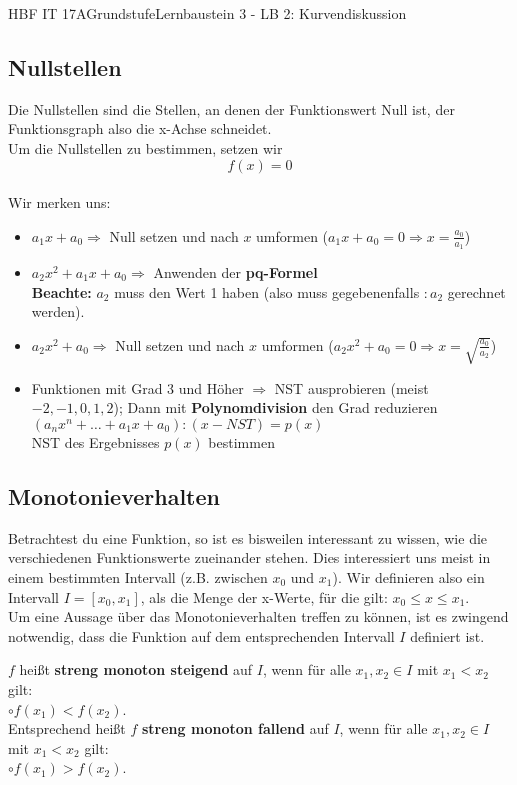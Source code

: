 \documentclass[11pt,twocolumn,oneside,openany,headings=optiontotoc,11pt,numbers=noenddot]{article}
\begin{document}
\begin{worksheet}{HBF IT 17A}{Grundstufe}{Lernbaustein 3 - LB 2: Kurvendiskussion}
		\subsection*{Nullstellen} Die Nullstellen sind die Stellen, an denen der Funktionswert Null ist, der Funktionsgraph also die x-Achse schneidet.\\
		Um die Nullstellen zu bestimmen, setzen wir \[f(x) = 0\]\\
		Wir merken uns:
		\begin{itemize}
			\item \(a_1x + a_0 \Rightarrow\) Null setzen und nach \(x\) umformen (\(a_1x + a_0 = 0 \Rightarrow x = \frac{a_0}{a_1}\))
			\item  \(a_2x^2 + a_1x + a_0 \Rightarrow\) Anwenden der \textbf{pq-Formel}\\
			\textbf{Beachte:} \(a_2\) muss den Wert 1 haben (also muss gegebenenfalls \(:a_2\) gerechnet werden).
			\item \(a_2x^2 + a_0 \Rightarrow\) Null setzen und nach \(x\) umformen (\(a_2x^2 + a_0 = 0 \Rightarrow x = \sqrt{\frac{a_0}{a_2}}\))
			\item Funktionen mit Grad 3 und Höher \(\Rightarrow\) NST ausprobieren (meist \(-2,-1,0,1,2\)); Dann mit \textbf{Polynomdivision} den Grad reduzieren\\
			\((a_nx^n + \ldots +a_1x +a_0):(x-NST) = p(x)\)\\
			NST des Ergebnisses \(p(x)\) bestimmen
		\end{itemize}
		\subsection*{Monotonieverhalten} Betrachtest du eine Funktion, so ist es bisweilen interessant zu wissen, wie die verschiedenen Funktionswerte zueinander stehen. Dies interessiert uns meist in einem bestimmten Intervall (z.B. zwischen \(x_0\) und \(x_1\)). Wir definieren also ein Intervall \(I = [x_0,x_1]\), als die Menge der x-Werte, für die gilt: \(x_0 \leq x \leq x_1\).\\
		Um eine Aussage über das Monotonieverhalten treffen zu können, ist es zwingend notwendig, dass die Funktion auf dem entsprechenden Intervall \(I\) definiert ist.\\
		\par\noindent
		\(f\) heißt \textbf{streng monoton steigend} auf \(I\), wenn für alle \(x_1,x_2 \in I\) mit \(x_1<x_2\) gilt:\\
		\(\circ f(x_1)<f(x_2)\).\\
		Entsprechend heißt \(f\) \textbf{streng monoton fallend} auf \(I\), wenn für alle \(x_1,x_2 \in I\) mit \(x_1<x_2\) gilt:\\
		\(\circ f(x_1) > f(x_2)\).

\end{worksheet}
\end{document}
